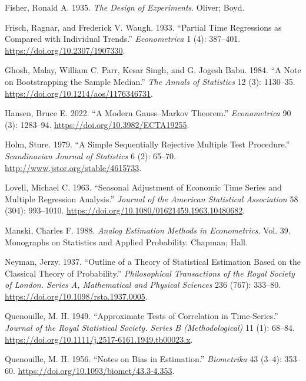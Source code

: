 \documentclass[
  13pt,
  letterpaper,
  DIV=11,
  numbers=noendperiod]{scrreprt}
\newlength{\cslhangindent}
\newenvironment{CSLReferences}[2] %
 {\begin{list}{}{%
  \setlength{\itemindent}{0pt}
  \setlength{\leftmargin}{0pt}
  \setlength{\parsep}{0pt}
  \ifodd #1
   \setlength{\leftmargin}{\cslhangindent}
   \setlength{\itemindent}{-1\cslhangindent}
  \fi
  \setlength{\itemsep}{#2\baselineskip}}}
 {\end{list}}
\theoremstyle{plain}
\theoremstyle{plain}
\theoremstyle{definition}
\theoremstyle{definition}
\theoremstyle{remark}
\begin{document}
\begin{CSLReferences}{1}{1}
Fisher, Ronald A. 1935. \emph{The Design of Experiments}. Oliver; Boyd.

Frisch, Ragnar, and Frederick V. Waugh. 1933. {``Partial Time
Regressions as Compared with Individual Trends.''} \emph{Econometrica} 1
(4): 387--401. \url{https://doi.org/10.2307/1907330}.

Ghosh, Malay, William C. Parr, Kesar Singh, and G. Jogesh Babu. 1984.
{``A Note on Bootstrapping the Sample Median.''} \emph{The Annals of
Statistics} 12 (3): 1130--35.
\url{https://doi.org/10.1214/aos/1176346731}.

Hansen, Bruce E. 2022. {``A {Modern Gauss}--{Markov Theorem}.''}
\emph{Econometrica} 90 (3): 1283--94.
\url{https://doi.org/10.3982/ECTA19255}.

Holm, Sture. 1979. {``A Simple Sequentially Rejective Multiple Test
Procedure.''} \emph{Scandinavian Journal of Statistics} 6 (2): 65--70.
\url{http://www.jstor.org/stable/4615733}.

Lovell, Michael C. 1963. {``Seasonal Adjustment of Economic Time Series
and Multiple Regression Analysis.''} \emph{Journal of the American
Statistical Association} 58 (304): 993--1010.
\url{https://doi.org/10.1080/01621459.1963.10480682}.

Manski, Charles F. 1988. \emph{Analog Estimation Methods in
Econometrics}. Vol. 39. Monographs on Statistics and Applied
Probability. Chapman; Hall.

Neyman, Jerzy. 1937. {``Outline of a Theory of Statistical Estimation
Based on the Classical Theory of Probability.''} \emph{Philosophical
Transactions of the Royal Society of London. Series A, Mathematical and
Physical Sciences} 236 (767): 333--80.
\url{https://doi.org/10.1098/rsta.1937.0005}.

Quenouille, M. H. 1949. {``Approximate Tests of Correlation in
Time-Series.''} \emph{Journal of the Royal Statistical Society. Series B
(Methodological)} 11 (1): 68--84.
\url{https://doi.org/10.1111/j.2517-6161.1949.tb00023.x}.

Quenouille, M. H. 1956. {``Notes on Bias in Estimation.''}
\emph{Biometrika} 43 (3--4): 353--60.
\url{https://doi.org/10.1093/biomet/43.3-4.353}.


\end{CSLReferences}
\end{document}
